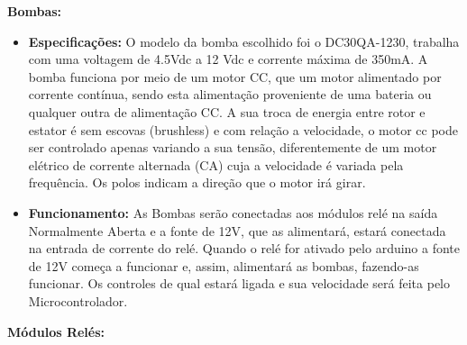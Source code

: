 \textbf{Bombas:}
\begin{itemize}
    \item \textbf{Especificações:} O modelo da bomba escolhido foi o DC30QA-1230, trabalha com uma voltagem de 4.5Vdc a 12 Vdc e corrente máxima de 350mA. A bomba funciona por meio de um motor CC, que um motor alimentado por corrente contínua, sendo esta alimentação proveniente de uma bateria ou qualquer outra de alimentação CC. A sua troca de energia entre rotor e estator é sem escovas (brushless) e com relação a velocidade, o motor cc pode ser controlado apenas variando a sua tensão, diferentemente de um motor elétrico de corrente alternada (CA) cuja a velocidade é variada pela frequência. Os polos indicam a direção que o motor irá girar.

    \item \textbf{Funcionamento:} As Bombas serão conectadas aos módulos relé na saída Normalmente Aberta e a fonte de 12V, que as alimentará, estará conectada na entrada de corrente do relé. Quando o relé for ativado pelo arduino a fonte de 12V começa a funcionar e, assim, alimentará as bombas, fazendo-as funcionar. Os controles de qual estará ligada e sua velocidade será feita pelo Microcontrolador.

\end{itemize}
\newpage
\textbf{Módulos Relés:}
